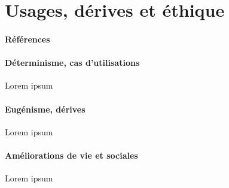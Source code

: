 \section{Usages, dérives et éthique}
\paragraph{Références} \cite{Asimov0} \cite{Damasio0}

\paragraph{Déterminisme, cas d'utilisations} Lorem ipsum

\paragraph{Eugénisme, dérives} Lorem ipsum

\paragraph{Améliorations de vie et sociales} Lorem ipsum